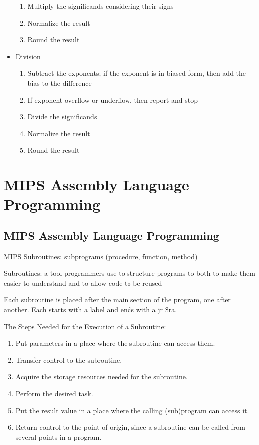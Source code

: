 \documentclass[12pt]{article}
\begin{document}
\begin{itemize}
\begin{enumerate}
\item Multiply the significands considering their signs 
\item Normalize the result 
\item Round the result \end{enumerate}
\item Division \begin{enumerate} 
\item Subtract the exponents; if the exponent is in biased form, then add the bias to the difference 
\item If exponent overflow or underflow, then report and stop 
\item Divide the significands 
\item Normalize the result 
\item Round the result \end{enumerate} 
\end{itemize} 



\section{MIPS Assembly Language Programming}
\subsection{MIPS Assembly Language Programming}

MIPS Subroutines: subprograms (procedure, function, method) 
\begin{definition} Subroutines: a tool programmers use to structure programs to both to make them easier to understand and to allow code to be reused \end{definition}

Each subroutine is placed after the main section of the program, one after another. Each starts with a label and ends with a jr \$ra. 


The Steps Needed for the Execution of a Subroutine: \begin{enumerate} 
\item Put parameters in a place where the subroutine can access them. 
\item Transfer control to the subroutine. 
\item Acquire the storage resources needed for the subroutine. 
\item Perform the desired task. 
\item Put the result value in a place where the calling (sub)program can access it. 
\item Return control to the point of origin, since a subroutine can be called from several points in a program. \end{enumerate} 
\end{document}
